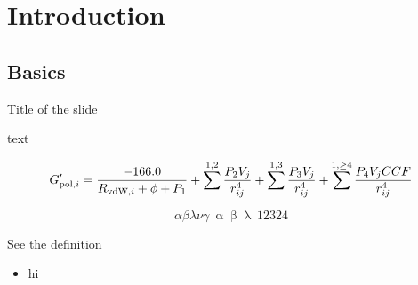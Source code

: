 \documentclass[10pt]{beamer}
\begin{document}

\section{Introduction}

\subsection{Basics}


\begin{frame}[t]{Title of the slide}

text

\begin{equation*}
G^\prime_{\textnormal{pol},i} = 
\frac{-166.0}{R_{\textnormal{vdW},i}+\phi+P_1} + 
\sum^{1,2}\frac{P_2V_j}{r^4_{ij}} + 
\sum^{1,3}\frac{P_3V_j}{r^4_{ij}} + 
\sum^{1,\ge 4}\frac{P_4V_jCCF}{r^4_{ij}}
\end{equation*}

\begin{equation*}
\alpha\beta\lambda\nu\gamma~\upalpha\upbeta\uplambda~12324
\end{equation*}

See the \alert{definition}

\begin{itemize}
    \item hi
\end{itemize}

\end{frame}

\end{document}
